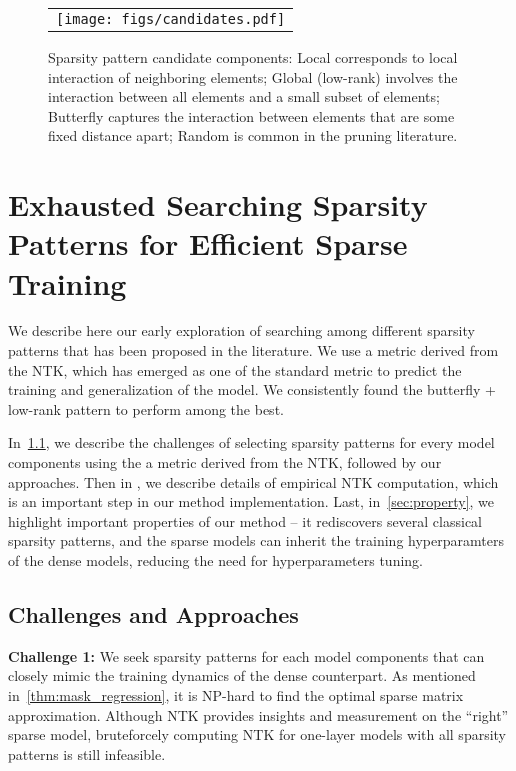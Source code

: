\begin{figure}[t]
	\begin{center}
	\scriptsize
		\begin{tabular}{c}
			\texttt{[image: figs/candidates.pdf]}
		\end{tabular}
	\end{center}
	\caption{Sparsity pattern candidate components:  Local corresponds to local interaction of neighboring elements; Global (low-rank) involves the interaction between all elements and a small subset of elements; Butterfly captures the interaction between elements that are some fixed distance apart; Random is common in the pruning literature.}
	\label{fig:block_sparse_visualization} 
\end{figure}

\section{Exhausted Searching Sparsity Patterns for Efficient Sparse Training}
\label{sec:appx_ntk_algorithm}
We describe here our early exploration of searching among different sparsity patterns that has been proposed in the literature.
We use a metric derived from the NTK, which has emerged as one of the standard metric to predict the training and generalization of the model.
We consistently found the butterfly + low-rank pattern to perform among the best.

In~\cref{sec:challenges}, we describe the challenges of selecting sparsity patterns for every model components using the a metric derived from the NTK, followed by our approaches.
Then in , we describe details of empirical NTK computation, which is an important step in our method implementation. 
Last, in~\cref{sec:property}, we highlight important properties of our method -- it rediscovers several classical sparsity patterns, and the sparse models can inherit the training hyperparamters of the dense models, reducing the need for hyperparameters tuning.

\subsection{Challenges and Approaches}
\label{sec:challenges}

\textbf{Challenge 1:} We seek sparsity patterns for each model components that can closely mimic the training dynamics of the dense counterpart. As mentioned in~\cref{thm:mask_regression}, it is NP-hard to find the optimal sparse matrix approximation. Although NTK provides insights and measurement on the ``right'' sparse model, bruteforcely computing NTK for one-layer models with all sparsity patterns is still infeasible.

